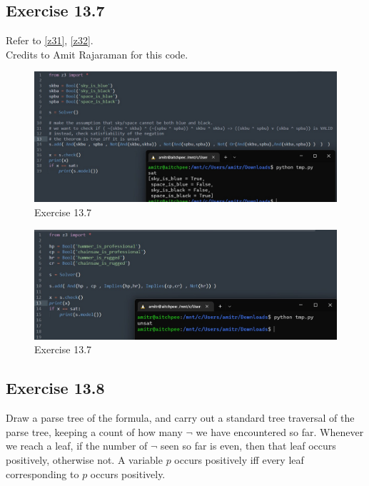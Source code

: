 \documentclass{article}
\begin{document}
\subsection*{Exercise 13.7}
Refer to \autoref{z31}, \autoref{z32}.\\
Credits to Amit Rajaraman for this code.
\begin{figure}[h]
	\centering
	\includegraphics[scale=0.3]{z31.jpeg}
	\caption{Exercise 13.7}
    \label{z31}
\end{figure}
\begin{figure}[h]
	\centering
	\includegraphics[scale=0.3]{z32.jpeg}
	\caption{Exercise 13.7}
    \label{z32}
\end{figure}
\subsection*{Exercise 13.8}
Draw a parse tree of the formula, and carry out a standard tree traversal of the parse tree, keeping a count of how many $\lnot$ we have encountered so far. Whenever we reach a leaf, if the number of $\lnot$ seen so far is even, then that leaf occurs positively, otherwise not. A variable $p$ occurs positively iff every leaf corresponding to $p$ occurs positively.
\end{document}
